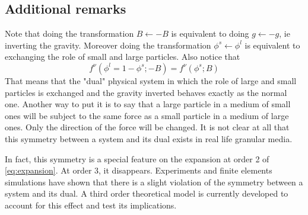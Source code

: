 \subsection{Additional remarks}

Note that doing the transformation $B \leftarrow -B$ is equivalent to doing $g \leftarrow -g$, ie inverting the gravity. Moreover doing the transformation $\phi^s \leftarrow \phi^l$ is equivalent to exchanging the role of small and large particles. Also notice that
\begin{equation}
	f^\nu(\phi^l = 1 - \phi^s; -B) = f^\nu( \phi^s; B)
\end{equation}
That means that the "dual" physical system in which the role of large and small particles is exchanged and the gravity inverted behaves exactly as the normal one. Another way to put it is to say that a large particle in a medium of small ones will be subject to the same force as a small particle in a medium of large ones. Only the direction of the force will be changed. It is not clear at all that this symmetry between a system and its dual exists in real life granular media. 

In fact, this symmetry is a special feature on the expansion at order 2 of \ref{eq:expansion}. At order 3, it disappears. Experiments and finite elements simulations have shown that there is a slight violation of the symmetry between a system and its dual. A third order  theoretical model is currently developed to account for this effect and test its implications.
